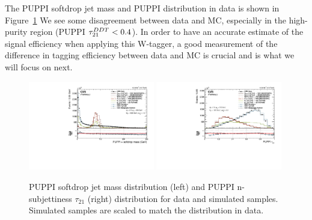 The PUPPI softdrop jet mass and PUPPI \nsubj distribution in data is shown in Figure~\ref{fig:searchII:wtag}
We see some disagreement between data and MC, especially in the high-purity region (PUPPI $\tau_{21}^{DDT}<0.4$). In order to have an accurate estimate of the signal efficiency when applying this W-tagger, a good measurement of the difference in tagging efficiency between data and MC is crucial and is what we will focus on next.
\begin{figure}[h!]
\centering
\includegraphics[width=0.49\textwidth]{figures/analysis/search2/AN-16-235/plots/qcdcp_PuppiSoftdropMass.pdf}
\includegraphics[width=0.49\textwidth]{figures/analysis/search2/AN-16-235/plots/qcdcp_puppi_tau2tau1.pdf}
\caption{PUPPI softdrop jet mass distribution (left) and PUPPI n-subjettiness $\tau_{21}$ (right) distribution for data and simulated samples. Simulated samples are scaled to match the distribution in data.}
\label{fig:searchII:wtag}
\end{figure}

\clearpage


